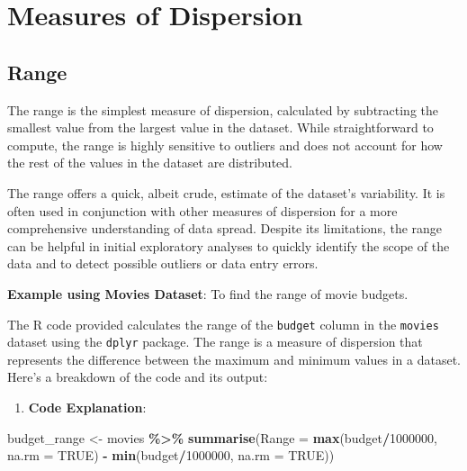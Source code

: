 \documentclass[
]{book}
\newenvironment{Shaded}{\begin{snugshade}}{\end{snugshade}}
\newcommand{\AttributeTok}[1]{\textcolor[rgb]{0.13,0.29,0.53}{#1}}
\newcommand{\ConstantTok}[1]{\textcolor[rgb]{0.56,0.35,0.01}{#1}}
\newcommand{\DecValTok}[1]{\textcolor[rgb]{0.00,0.00,0.81}{#1}}
\newcommand{\FunctionTok}[1]{\textcolor[rgb]{0.13,0.29,0.53}{\textbf{#1}}}
\newcommand{\NormalTok}[1]{#1}
\newcommand{\OtherTok}[1]{\textcolor[rgb]{0.56,0.35,0.01}{#1}}
\newcommand{\SpecialCharTok}[1]{\textcolor[rgb]{0.81,0.36,0.00}{\textbf{#1}}}
\providecommand{\tightlist}{%
  \setlength{\itemsep}{0pt}\setlength{\parskip}{0pt}}
\begin{document}
\section{Measures of Dispersion}\label{measures-of-dispersion}

\subsection*{Range}\label{range}

The range is the simplest measure of dispersion, calculated by subtracting the smallest value from the largest value in the dataset. While straightforward to compute, the range is highly sensitive to outliers and does not account for how the rest of the values in the dataset are distributed.

The range offers a quick, albeit crude, estimate of the dataset's variability. It is often used in conjunction with other measures of dispersion for a more comprehensive understanding of data spread. Despite its limitations, the range can be helpful in initial exploratory analyses to quickly identify the scope of the data and to detect possible outliers or data entry errors.

\textbf{Example using Movies Dataset}: To find the range of movie budgets.

The R code provided calculates the range of the \texttt{budget} column in the \texttt{movies} dataset using the \texttt{dplyr} package. The range is a measure of dispersion that represents the difference between the maximum and minimum values in a dataset. Here's a breakdown of the code and its output:

\begin{enumerate}
\def\labelenumi{\arabic{enumi}.}
\tightlist
\item
  \textbf{Code Explanation}:
\end{enumerate}

\begin{Shaded}
\begin{Highlighting}[]
\NormalTok{budget\_range }\OtherTok{\textless{}{-}}\NormalTok{ movies }\SpecialCharTok{\%\textgreater{}\%}
  \FunctionTok{summarise}\NormalTok{(}\AttributeTok{Range =} \FunctionTok{max}\NormalTok{(budget}\SpecialCharTok{/}\DecValTok{1000000}\NormalTok{, }
                        \AttributeTok{na.rm =} \ConstantTok{TRUE}\NormalTok{) }\SpecialCharTok{{-}} \FunctionTok{min}\NormalTok{(budget}\SpecialCharTok{/}\DecValTok{1000000}\NormalTok{,}
                                            \AttributeTok{na.rm =} \ConstantTok{TRUE}\NormalTok{))}
\end{Highlighting}
\end{Shaded}
\end{document}
